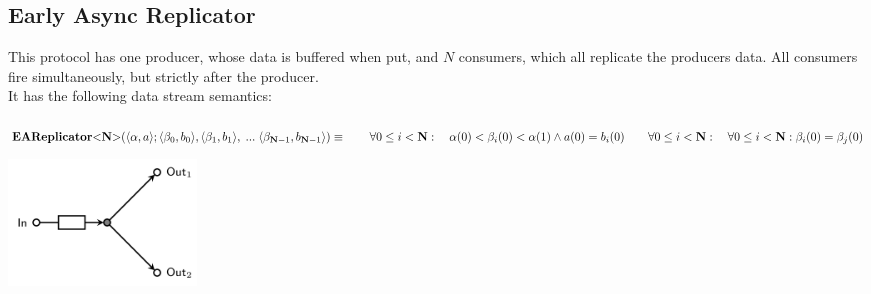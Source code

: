 \subsection{Early Async Replicator}
\begin{minipage}{.65\textwidth}
  This protocol has one producer, whose data is buffered when put, and $N$ consumers, which all replicate the producers data.
  All consumers fire simultaneously, but strictly after the producer.\\
  It has the following data stream semantics:\\\\
  $
  \vspace{0.2cm}\earep (\langle \alpha, a \rangle ; \langle \beta_0, b_0 \rangle, \langle \beta_1, b_1 \rangle,\; ... \; \langle \beta_{\textbf{N}-1}, b_{\textbf{N}-1} \rangle) \equiv \\
  \vspace{0.2cm} \hphantom \qquad \forall 0 \leq i < \textbf{N} : \quad \alpha(0) < \beta_i(0) < \alpha(1) \land a(0) = b_i(0) \\
  \hphantom \qquad\forall 0 \leq i < \textbf{N} :\quad \forall 0 \leq i < \textbf{N} : \beta_i(0) = \beta_j(0)
  $\\

\end{minipage}\hfill
\begin{minipage}{.25\textwidth}
  \includegraphics[width=5cm]{img/EARep.png}\\
\end{minipage}

